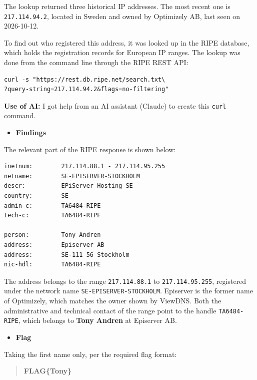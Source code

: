 \documentclass[11pt]{article}
\begin{document}
\noindent The lookup returned three historical IP addresses. The most recent one is \texttt{217.114.94.2}, located in Sweden and owned by Optimizely AB, last seen on 2026-10-12.

\noindent To find out who registered this address, it was looked up in the RIPE database, which holds the registration records for European IP ranges. The lookup was done from the command line through the RIPE REST API:

\begin{verbatim}
curl -s "https://rest.db.ripe.net/search.txt\
?query-string=217.114.94.2&flags=no-filtering"
\end{verbatim}

\noindent \textbf{Use of AI:} I got help from an AI assistant (Claude) to create this \texttt{curl} command.

\begin{itemize}[leftmargin=1.5em]
    \item \textbf{Findings}
\end{itemize}
\noindent The relevant part of the RIPE response is shown below:

\begin{verbatim}
inetnum:        217.114.88.1 - 217.114.95.255
netname:        SE-EPISERVER-STOCKHOLM
descr:          EPiServer Hosting SE
country:        SE
admin-c:        TA6484-RIPE
tech-c:         TA6484-RIPE

person:         Tony Andren
address:        Episerver AB
address:        SE-111 56 Stockholm
nic-hdl:        TA6484-RIPE
\end{verbatim}

\noindent The address belongs to the range \texttt{217.114.88.1} to \texttt{217.114.95.255}, registered under the network name \texttt{SE-EPISERVER-STOCKHOLM}. Episerver is the former name of Optimizely, which matches the owner shown by ViewDNS. Both the administrative and technical contact of the range point to the handle \texttt{TA6484-RIPE}, which belongs to \textbf{Tony Andren} at Episerver AB.

\begin{itemize}[leftmargin=1.5em]
    \item \textbf{Flag}
\end{itemize}
\noindent Taking the first name only, per the required flag format:

\begin{quote}
\textbf{FLAG\{Tony\}}
\end{quote}
\end{document}
